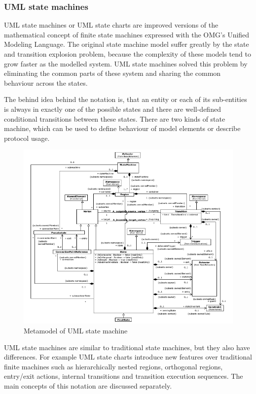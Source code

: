 
\subsubsection{UML state machines}
\label{ssub:umlstatemachine}

UML state machines or UML state charts are improved versions of the mathematical concept of finite state machines expressed with the OMG's Unified Modeling Language. The original state machine model suffer greatly by the state and transition explosion problem, because the complexity of these models tend to grow faster as the modelled system. UML state machines solved this problem by eliminating the common parts of these system and sharing the common behaviour across the states.

The behind idea behind the notation is, that an entity or each of its sub-entities is always in exactly one of the possible states and there are well-defined conditional transitions between these states. There are two kinds of state machine, which can be used to define behaviour of model elements or describe protocol usage.

\begin{figure}[htp]
\centering
\includegraphics[scale=0.5]{figures/statemachine_metamodel}
\caption{Metamodel of UML state machine \cite{omguml}}
\label{fig:statemachine_metamodel}
\end{figure}

UML state machines are similar to traditional state machines, but they also have differences. For example UML state charts introduce new features over traditional finite machines such as hierarchically nested regions, orthogonal regions, entry/exit actions, internal transitions and transition execution sequences. The main concepts of this notation are discussed separately.

